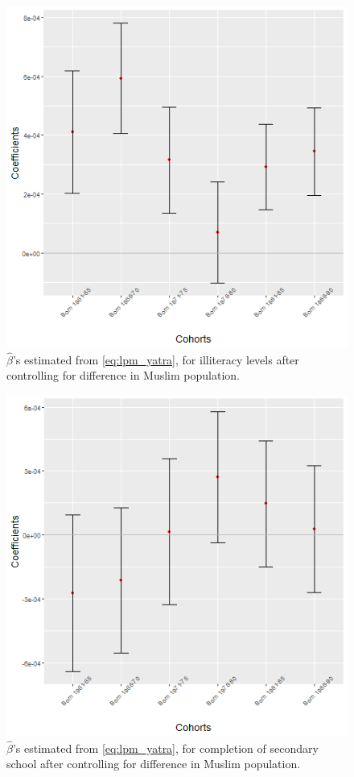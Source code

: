 \documentclass{article}
\begin{document}
\begin{figure}[H]
    \centering
    \includegraphics[scale = 0.4]{images/graph_coeff_ill_mig.png}
    \caption{$\hat{\beta}$'s estimated from \eqref{eq:lpm_yatra}, for illiteracy levels after controlling for difference in Muslim population.}
    \label{fig:coeff_ill_mig}
\end{figure}

\begin{figure}[H]
    \centering
    \includegraphics[scale = 0.4]{images/graph_coeff_sec_mig.png}
    \caption{$\hat{\beta}$'s estimated from \eqref{eq:lpm_yatra}, for completion of secondary school after controlling for difference in Muslim population.}
    \label{fig:coeff_sec_mig}
\end{figure}
\end{document}
